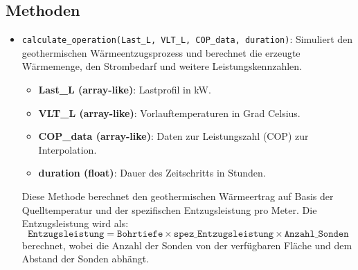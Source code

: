 \subsection{Methoden}
\begin{itemize}
    \item \texttt{calculate\_operation(Last\_L, VLT\_L, COP\_data, duration)}: Simuliert den geothermischen Wärmeentzugsprozess und berechnet die erzeugte Wärmemenge, den Strombedarf und weitere Leistungskennzahlen.
    \begin{itemize}
        \item \textbf{Last\_L (array-like)}: Lastprofil in kW.
        \item \textbf{VLT\_L (array-like)}: Vorlauftemperaturen in Grad Celsius.
        \item \textbf{COP\_data (array-like)}: Daten zur Leistungszahl (COP) zur Interpolation.
        \item \textbf{duration (float)}: Dauer des Zeitschritts in Stunden.
    \end{itemize}
    Diese Methode berechnet den geothermischen Wärmeertrag auf Basis der Quelltemperatur und der spezifischen Entzugsleistung pro Meter. Die Entzugsleistung wird als:
    \[
    \texttt{Entzugsleistung} = \texttt{Bohrtiefe} \times \texttt{spez\_Entzugsleistung} \times \texttt{Anzahl\_Sonden}
    \]
    berechnet, wobei die Anzahl der Sonden von der verfügbaren Fläche und dem Abstand der Sonden abhängt.
    

\end{itemize}
